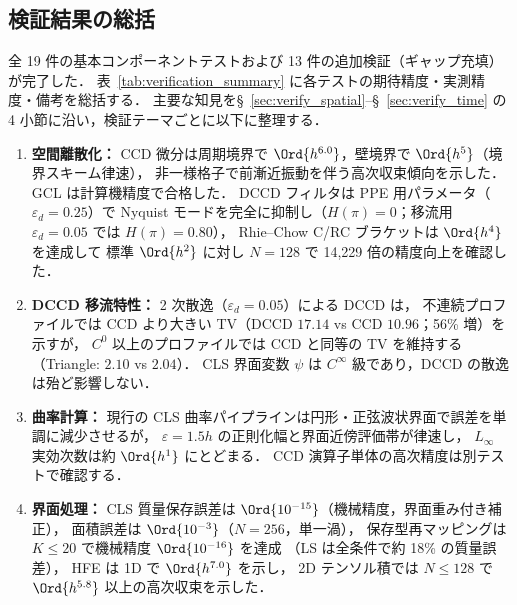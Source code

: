 %
\subsection{検証結果の総括}
\label{sec:verify_summary}

全 19 件の基本コンポーネントテストおよび 13 件の追加検証（ギャップ充填）が完了した．
表~\ref{tab:verification_summary} に各テストの期待精度・実測精度・備考を総括する．
主要な知見を§~\ref{sec:verify_spatial}--§~\ref{sec:verify_time} の 4 小節に沿い，検証テーマごとに以下に整理する．

\begin{enumerate}
  \item \textbf{空間離散化：}
        CCD 微分は周期境界で $\Ord{h^{6.0}}$，壁境界で $\Ord{h^5}$（境界スキーム律速），
        非一様格子で前漸近振動を伴う高次収束傾向を示した．
        GCL は計算機精度で合格した．
        DCCD フィルタは PPE 用パラメータ（$\varepsilon_d=0.25$）で Nyquist モードを完全に抑制し（$H(\pi)=0$；移流用 $\varepsilon_d=0.05$ では $H(\pi)=0.80$），
        Rhie--Chow C/RC ブラケットは $\Ord{h^4}$ を達成して
        標準 $\Ord{h^2}$ に対し $N{=}128$ で 14{,}229 倍の精度向上を確認した．
  \item \textbf{DCCD 移流特性：}
        2 次散逸（$\varepsilon_d = 0.05$）による DCCD は，
        不連続プロファイルでは CCD より大きい TV（DCCD $17.14$ vs CCD $10.96$；56\% 増）を示すが，
        $C^0$ 以上のプロファイルでは CCD と同等の TV を維持する
        （Triangle: $2.10$ vs $2.04$）．
        CLS 界面変数 $\psi$ は $C^\infty$ 級であり，DCCD の散逸は殆ど影響しない．
  \item \textbf{曲率計算：}
        現行の CLS 曲率パイプラインは円形・正弦波状界面で誤差を単調に減少させるが，
        $\varepsilon=1.5h$ の正則化幅と界面近傍評価帯が律速し，
        $L_\infty$ 実効次数は約 $\Ord{h^1}$ にとどまる．
        CCD 演算子単体の高次精度は別テストで確認する．
  \item \textbf{界面処理：}
        CLS 質量保存誤差は $\Ord{10^{-15}}$（機械精度，界面重み付き補正），
        面積誤差は $\Ord{10^{-3}}$（$N{=}256$，単一渦），
        保存型再マッピングは $K \leq 20$ で機械精度 $\Ord{10^{-16}}$ を達成
        （LS は全条件で約 18\% の質量誤差），
        HFE は 1D で $\Ord{h^{7.0}}$ を示し，
        2D テンソル積では $N\le128$ で $\Ord{h^{5.8}}$ 以上の高次収束を示した．

\end{enumerate}
